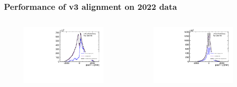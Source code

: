 \documentclass[aspectratio=1610, 12pt, xcolor=dvipsnames]{beamer}
\begin{document}
\begin{frame}\frametitle{Performance of v3 alignment on 2022 data}
  \begin{columns}
    \begin{column}[c]{0.49\textwidth}
      \begin{figure}
        \includegraphics[width=\textwidth]{plots/xT1_moore.pdf}
      \end{figure}
    \end{column}
    \begin{column}[c]{0.49\textwidth}
      \begin{figure}
        \includegraphics[width=\textwidth]{plots/yT1_moore.pdf}
      \end{figure}
    \end{column}
  \end{columns}  
\end{frame}
\end{document}
